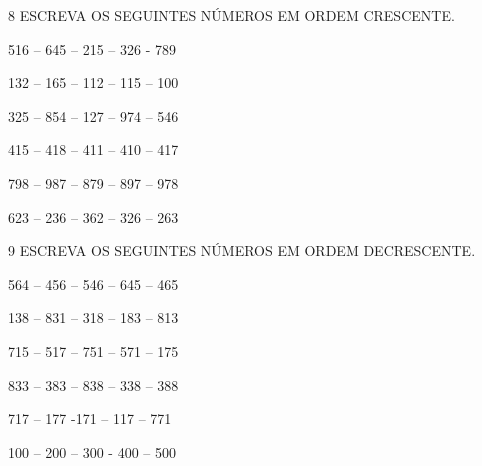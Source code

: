 
\num{8} ESCREVA OS SEGUINTES NÚMEROS EM ORDEM CRESCENTE.

\begin{escolha}
\item 516 -- 645 -- 215 -- 326 - 789



\item 132 -- 165 -- 112 -- 115 -- 100



\item 325 -- 854 -- 127 -- 974 -- 546



\item 415 -- 418 -- 411 -- 410 -- 417



\item 798 -- 987 -- 879 -- 897 -- 978



\item 623 -- 236 -- 362 -- 326 -- 263

\end{escolha}

\num{9} ESCREVA OS SEGUINTES NÚMEROS EM ORDEM DECRESCENTE.

\begin{escolha}
\item 564 -- 456 -- 546 -- 645 -- 465


\item 138 -- 831 -- 318 -- 183 -- 813


\item 715 -- 517 -- 751 -- 571 -- 175


\item 833 -- 383 -- 838 -- 338 -- 388


\item 717 -- 177 -171 -- 117 -- 771


\item 100 -- 200 -- 300 - 400 -- 500

\end{escolha}

